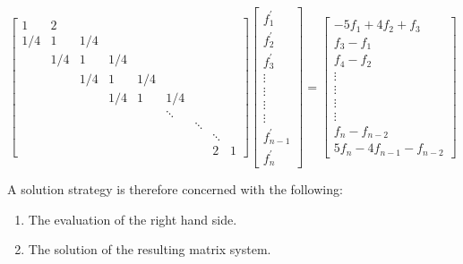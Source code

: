\documentclass{article}
\begin{document}
    \begin{equation} \label{eqn:compact-tridiagonal-system}
     \begin{bmatrix}
         1&2\\
         1/4&1&1/4\\
         &1/4&1&1/4\\
         &&1/4&1&1/4\\
         &&&1/4&1&1/4\\
         &&&&&\ddots\\
         &&&&&&\ddots\\
         &&&&&&&\ddots\\
         &&&&&&&2&1
      \end{bmatrix}
      \begin{bmatrix}
          f^{\prime}_1 \\
          f^{\prime}_2 \\
          f^{\prime}_3 \\
          \vdots \\
          \vdots \\
          \vdots \\
          \vdots \\
          f^{\prime}_{n-1} \\
          f^{\prime}_n
       \end{bmatrix}
     =
     \begin{bmatrix}
         -5f_1 + 4f_2 + f_3\\
         f_{3} - f_{1}\\
         f_{4} - f_{2}\\
         \vdots\\
         \vdots\\
         \vdots\\
         \vdots\\
         f_{n} - f_{n-2}\\
         5f_{n} - 4f_{n-1} - f_{n-2}
      \end{bmatrix}
    \end{equation}

    A solution strategy is therefore concerned with the following:

    \begin{enumerate}
        \item{The evaluation of the right hand side.}
        \item{The solution of the resulting matrix system.}
    \end{enumerate}
\end{document}
